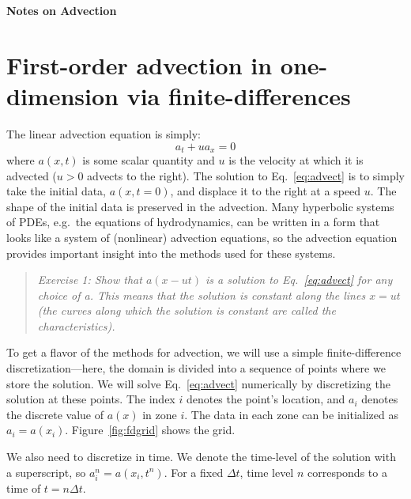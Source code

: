 \documentclass[11pt]{article}
\begin{document}
\begin{center}
{\LARGE \textsf{\textbf{
Notes on Advection}}
}
\end{center}

\begin{quote}
\end{quote}


\section{First-order advection in one-dimension via finite-differences}

The linear advection equation is simply:
\begin{equation}
\label{eq:advect}
a_t + u a_x = 0
\end{equation}
where $a(x,t)$ is some scalar quantity and $u$ is the velocity at
which it is advected ($u > 0$ advects to the right).  The solution to
Eq.~\ref{eq:advect} is to simply take the initial data, $a(x,t=0)$,
and displace it to the right at a speed $u$.  The shape of the initial
data is preserved in the advection.  Many hyperbolic systems of PDEs,
e.g.\ the equations of hydrodynamics, can be written in a form that
looks like a system of (nonlinear) advection equations, so the
advection equation provides important insight into the methods used
for these systems.
%
\begin{quote}
{\em Exercise 1: Show that $a(x - ut)$ is a solution to
  Eq.~\ref{eq:advect} for any choice of a.  This means that
the solution is constant along the lines $x = u t$
(the curves along which the solution is constant are called the
characteristics).}
\end{quote}

To get a flavor of the methods for advection, we will use a simple
finite-difference discretization---here, the domain is divided into
a sequence of points where we store the solution.
We will solve
Eq.~\ref{eq:advect} numerically by discretizing the solution at
these points.  The index $i$ denotes the point's location, and $a_i$
denotes the discrete value of $a(x)$ in zone $i$.  The data in each
zone can be initialized as $a_i = a(x_i)$.  Figure~\ref{fig:fdgrid}
shows the grid.

We also need to discretize in time.  We denote the time-level of the
solution with a superscript, so $a_i^n = a(x_i,t^n)$.  For a fixed
$\Delta t$, time level $n$ corresponds to a time of $t = n\Delta t$.
\end{document}
